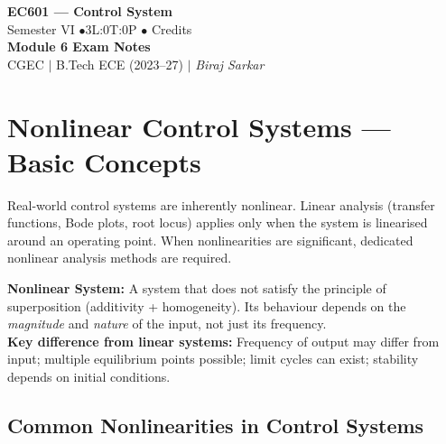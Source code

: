 \documentclass[12pt,a4paper]{article}
\begin{document}
\begin{center}
  {\LARGE\bfseries\color{myred} EC601 --- Control System}\\[5pt]
  {\normalsize\color{mydark} Semester VI \quad$\bullet$\quad 3L:0T:0P \quad$\bullet$ Credits}\\[3pt]
  {\normalsize\color{myteal}\textbf{Module 6 Exam Notes}}\\[3pt]
  {\small\color{mydark} CGEC \;$|$\; B.Tech ECE (2023--27) \;$|$\; \textit{Biraj Sarkar}}
\end{center}
\vspace{2pt}\noindent{\color{myred}\rule{\linewidth}{1.5pt}}\vspace{2pt}
\hypersetup{linkcolor=mydark}
\tableofcontents
\hypersetup{linkcolor=myteal}\newpage

\section{Nonlinear Control Systems --- Basic Concepts}

Real-world control systems are inherently nonlinear. Linear analysis (transfer functions, Bode plots, root locus) applies only when the system is linearised around an operating point. When nonlinearities are significant, dedicated nonlinear analysis methods are required.

\begin{tcolorbox}[defbox]
\textbf{Nonlinear System:} A system that does not satisfy the principle of superposition (additivity + homogeneity). Its behaviour depends on the \textit{magnitude} and \textit{nature} of the input, not just its frequency.\\[4pt]
\textbf{Key difference from linear systems:} Frequency of output may differ from input; multiple equilibrium points possible; limit cycles can exist; stability depends on initial conditions.
\end{tcolorbox}

\subsection{Common Nonlinearities in Control Systems}
\end{document}
